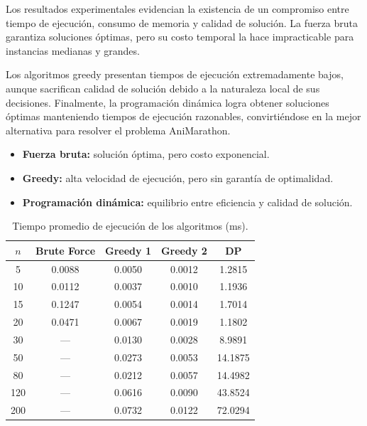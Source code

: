 Los resultados experimentales evidencian la existencia de un compromiso entre tiempo de ejecución, consumo de memoria y calidad de solución. La fuerza bruta garantiza soluciones óptimas, pero su costo temporal la hace impracticable para instancias medianas y grandes.

Los algoritmos greedy presentan tiempos de ejecución extremadamente bajos, aunque sacrifican calidad de solución debido a la naturaleza local de sus decisiones. Finalmente, la programación dinámica logra obtener soluciones óptimas manteniendo tiempos de ejecución razonables, convirtiéndose en la mejor alternativa para resolver el problema AniMarathon.

\begin{itemize}
    \item \textbf{Fuerza bruta:} solución óptima, pero costo exponencial.
    \item \textbf{Greedy:} alta velocidad de ejecución, pero sin garantía de optimalidad.
    \item \textbf{Programación dinámica:} equilibrio entre eficiencia y calidad de solución.
\end{itemize}

\begin{table}[H]
\centering
\begin{tabular}{c|c|c|c|c}
\hline
$n$ & Brute Force & Greedy 1 & Greedy 2 & DP \\
\hline
5   & 0.0088 & 0.0050 & 0.0012 & 1.2815 \\
10  & 0.0112 & 0.0037 & 0.0010 & 1.1936 \\
15  & 0.1247 & 0.0054 & 0.0014 & 1.7014 \\
20  & 0.0471 & 0.0067 & 0.0019 & 1.1802 \\
30  & --- & 0.0130 & 0.0028 & 8.9891 \\
50  & --- & 0.0273 & 0.0053 & 14.1875 \\
80  & --- & 0.0212 & 0.0057 & 14.4982 \\
120 & --- & 0.0616 & 0.0090 & 43.8524 \\
200 & --- & 0.0732 & 0.0122 & 72.0294 \\
\hline
\end{tabular}
\caption{Tiempo promedio de ejecución de los algoritmos (ms).}
\end{table}